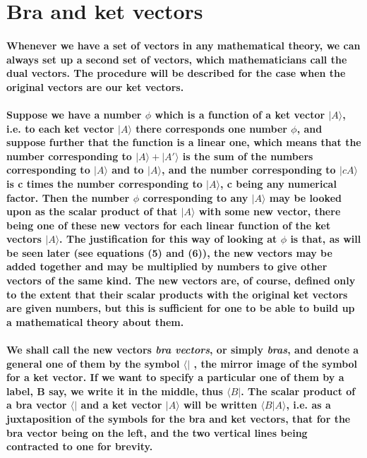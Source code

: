 \documentclass[10pt, kindle, oneside]{kindle}
\begin{document}
\section{Bra and ket vectors}
\paragraph{Whenever we have a set of vectors in any mathematical theory, we can always set up a second set of vectors, which mathematicians call the dual vectors. The procedure will be described for the case when the original vectors are our ket vectors.}
\paragraph{Suppose we have a number $\phi$ which is a function of a ket vector $|A\rangle$, i.e. to each ket vector $|A\rangle$ there corresponds one number $\phi$, and suppose further that the function is a linear one, which means that the number corresponding to $|A \rangle+|A'\rangle$ is the sum of the numbers corresponding to $|A \rangle$ and to $|A \rangle$, and the number corresponding to $|cA \rangle$ is c times the number corresponding to $|A \rangle$, c being any numerical factor. Then the number $\phi$ corresponding to any $|A \rangle$ may be looked upon as the scalar product of that $|A \rangle$ with some new vector, there being one of these new vectors for each linear function of the ket vectors $ |A \rangle $. The justification for this way of looking at $\phi$ is that, as will be seen later (see equations (5) and (6)), the new vectors may be added together and may be multiplied by numbers to give other vectors of the same kind. The new vectors are, of course, defined only to the extent that their scalar products with the original ket vectors are given numbers, but this is sufficient for one to be able to build up a mathematical theory about them.}
\paragraph{We shall call the new vectors \textit{bra vectors}, or simply \textit{bras}, and denote a general one of them by the symbol $ \langle | $ , the mirror image of the symbol for a ket vector. If we want to specify a particular one of them by a label, B say, we write it in the middle, thus $ \langle B| $. The scalar product of a bra vector $\langle|$ and a ket vector $|A\rangle$ will be written $\langle B|A\rangle$, i.e. as a juxtaposition of the symbols for the bra and ket vectors, that for the bra vector being on the left, and the two vertical lines being contracted to one for brevity.}
\end{document}
